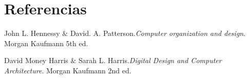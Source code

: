 \documentclass[12pt,letterpaper]{article}     %
\begin{document}
\section{Referencias}
\begin{thebibliography}{}

 John L. Hennessy $\&$ David. A. Patterson.\emph{Computer organization and design}. Morgan Kaufmann 5th ed.


 David Money Harris $\&$ Sarah L. Harris.\emph{Digital Design and Computer Architecture}. Morgan Kaufmann 2nd ed.


\end{thebibliography} 
	
\end{document}

